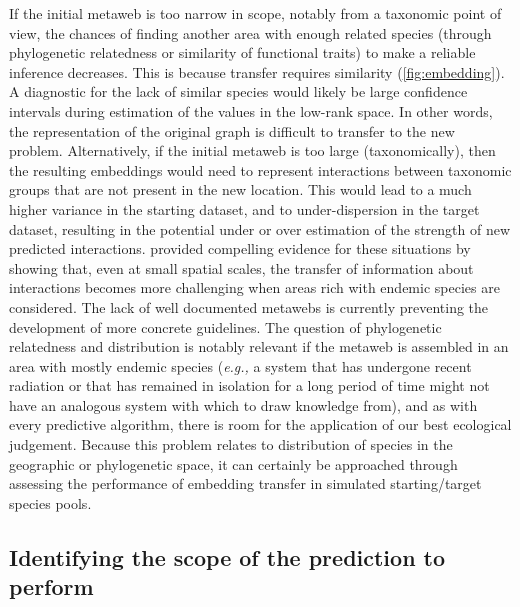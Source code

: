 If the initial metaweb is too narrow in scope, notably from a taxonomic
point of view, the chances of finding another area with enough related
species (through phylogenetic relatedness or similarity of functional
traits) to make a reliable inference decreases. This is because transfer
requires similarity (\autoref{fig:embedding}). A diagnostic for the lack of
similar species would likely be large confidence intervals during
estimation of the values in the low-rank space. In other words, the
representation of the original graph is difficult to transfer to the new
problem. Alternatively, if the initial metaweb is too large
(taxonomically), then the resulting embeddings would need to represent
interactions between taxonomic groups that are not present in the new
location. This would lead to a much higher variance in the starting
dataset, and to under-dispersion in the target dataset, resulting in the
potential under or over estimation of the strength of new predicted
interactions. \cite{Llewelyn2022Predicting} provided compelling evidence for
these situations by showing that, even at small spatial scales, the
transfer of information about interactions becomes more challenging when
areas rich with endemic species are considered. The lack of well
documented metawebs is currently preventing the development of more
concrete guidelines. The question of phylogenetic relatedness and
distribution is notably relevant if the metaweb is assembled in an area
with mostly endemic species (\emph{e.g.,} a system that has undergone
recent radiation or that has remained in isolation for a long period of
time might not have an analogous system with which to draw knowledge
from), and as with every predictive algorithm, there is room for the
application of our best ecological judgement. Because this problem
relates to distribution of species in the geographic or phylogenetic
space, it can certainly be approached through assessing the performance
of embedding transfer in simulated starting/target species pools.

\subsection{Identifying the scope of the prediction to
perform}\label{identifying-the-scope-of-the-prediction-to-perform}

